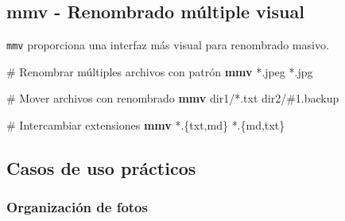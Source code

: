 \documentclass[
  11pt,
  letterpaper,
  oneside,
  openany]{scrbook}
\newenvironment{Shaded}{}{}
\newcommand{\CommentTok}[1]{\textcolor[rgb]{0.42,0.45,0.49}{#1}}
\newcommand{\ExtensionTok}[1]{\textcolor[rgb]{0.84,0.23,0.29}{\textbf{#1}}}
\newcommand{\StringTok}[1]{\textcolor[rgb]{0.01,0.18,0.38}{#1}}
\begin{document}
\subsection{mmv - Renombrado múltiple
visual}\label{mmv---renombrado-muxfaltiple-visual}

\texttt{mmv} proporciona una interfaz más visual para renombrado masivo.

\begin{Shaded}
\begin{Highlighting}[]
\CommentTok{\# Renombrar múltiples archivos con patrón}
\ExtensionTok{mmv} \StringTok{\textquotesingle{}*.jpeg\textquotesingle{}} \StringTok{\textquotesingle{}*.jpg\textquotesingle{}}

\CommentTok{\# Mover archivos con renombrado}
\ExtensionTok{mmv} \StringTok{\textquotesingle{}dir1/*.txt\textquotesingle{}} \StringTok{\textquotesingle{}dir2/\#1.backup\textquotesingle{}}

\CommentTok{\# Intercambiar extensiones}
\ExtensionTok{mmv} \StringTok{\textquotesingle{}*.\{txt,md\}\textquotesingle{}} \StringTok{\textquotesingle{}*.\{md,txt\}\textquotesingle{}}
\end{Highlighting}
\end{Shaded}

\subsection{Casos de uso prácticos}\label{casos-de-uso-pruxe1cticos}

\subsubsection{Organización de fotos}\label{organizaciuxf3n-de-fotos}
\end{document}
